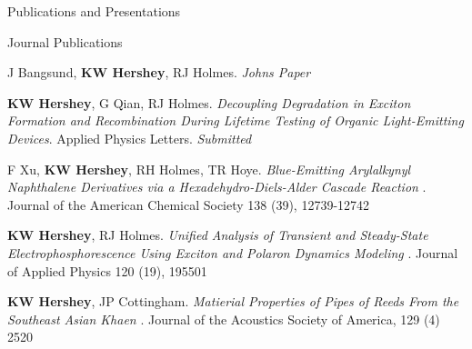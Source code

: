 \documentclass{resume} %
\begin{document}
\begin{rSection}{Publications and Presentations}
\begin{rSubsection}{Journal Publications}{}{}{}
\item J Bangsund, \textbf{KW Hershey}, RJ Holmes. {\em Johns Paper}
\item  \textbf{KW Hershey}, G Qian, RJ Holmes. {\em Decoupling Degradation in Exciton Formation and Recombination During Lifetime Testing of Organic Light-Emitting Devices}. Applied Physics Letters. {\em Submitted}
\item F Xu, \textbf{KW Hershey}, RH Holmes, TR Hoye. {\em Blue-Emitting Arylalkynyl Naphthalene Derivatives via a Hexadehydro-Diels-Alder Cascade Reaction} . Journal of the American Chemical Society 138 (39), 12739-12742
\item \textbf{KW Hershey}, RJ Holmes. {\em Unified Analysis of Transient and Steady-State Electrophosphorescence Using Exciton and Polaron Dynamics Modeling} . Journal of Applied Physics 120 (19), 195501
\item \textbf{KW Hershey}, JP Cottingham. {\em Matierial Properties of Pipes of Reeds From the Southeast Asian Khaen} . Journal of the Acoustics Society of America, 129 (4) 2520

\end{rSubsection}



\end{rSection}
\end{document}
